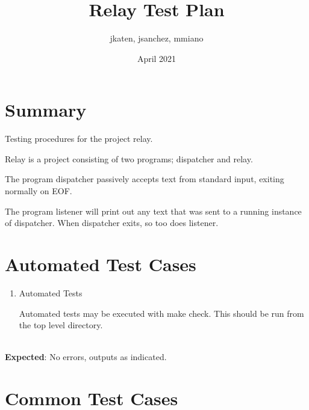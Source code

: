 \documentclass{article}
\title{Relay Test Plan}
\author{jkaten, jsanchez, mmiano}
\date{April 2021}
\begin{document}
\maketitle

\section{Summary}

Testing procedures for the project relay.

Relay is a project consisting of two programs; dispatcher and relay.

The program dispatcher passively accepts text from standard input, exiting normally on EOF.

The program listener will print out any text that was sent to a running instance of dispatcher. When dispatcher exits, so too does listener.

\section{Automated Test Cases}

\begin{enumerate}

    \item Automated Tests

    Automated tests may be executed with {\footnotesize make check}. This should be run from the top level directory.

\end{enumerate}

\\[.5cm]

\textbf{Expected}: No errors, outputs as indicated.

\section{Common Test Cases}
\end{document}
